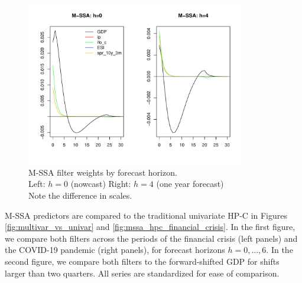 \documentclass[11pt,a4paper]{article}
\begin{document}
\begin{figure}[H]
    \begin{center}
        \includegraphics[width=0.85\textwidth]{./Figures/bk_h.pdf}
        \caption{M-SSA filter weights by forecast horizon.\\
        Left: $h=0$ (nowcast) \qquad Right: $h=4$ (one year forecast)\\
        Note the difference in scales.
        \label{fig:bk_h}}
    \end{center}
\end{figure}

M-SSA predictors are compared to the traditional univariate HP-C in Figures \ref{fig:multivar_vs_univar} and \ref{fig:mssa_hpc_financial_crisis}. In the first figure, we compare both filters across the periods of the financial crisis (left panels) and the COVID-19 pandemic (right panels), for forecast horizons $h=0,...,6$. In the second figure, we compare both filters to the forward-shifted GDP for shifts larger than two quarters. All series are standardized for ease of comparison. 
\end{document}
